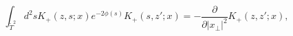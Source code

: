 \begin{equation}
\int _{\tilde T^2}
d^2s K_+(z,s;x)e^{-2\phi(s)}K_+(s,z';x)
=-\frac{\partial}{\partial|x_\perp|^2}K_+(z,z';x),
\end{equation}

